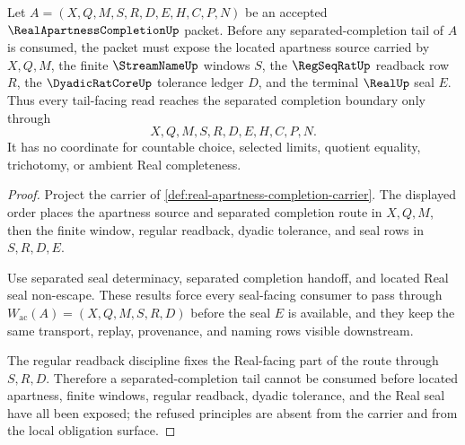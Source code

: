 \begin{theorem}
\label{thm:real-apartness-completion-located-tail-obligation}
Let $A=(X,Q,M,S,R,D,E,H,C,P,N)$ be an accepted $\RealApartnessCompletionUp$ packet. Before any separated-completion tail of $A$ is consumed, the packet must expose the located apartness source carried by $X,Q,M$, the finite $\StreamNameUp$ windows $S$, the $\RegSeqRatUp$ readback row $R$, the $\DyadicRatCoreUp$ tolerance ledger $D$, and the terminal $\RealUp$ seal $E$. Thus every tail-facing read reaches the separated completion boundary only through
$$
X,Q,M,S,R,D,E,H,C,P,N .
$$
It has no coordinate for countable choice, selected limits, quotient equality, trichotomy, or ambient Real completeness.
\end{theorem}
\begin{proof}
Project the carrier of \autoref{def:real-apartness-completion-carrier}. The displayed order places the apartness source and separated completion route in $X,Q,M$, then the finite window, regular readback, dyadic tolerance, and seal rows in $S,R,D,E$.

Use separated seal determinacy, separated completion handoff, and located Real seal non-escape. These results force every seal-facing consumer to pass through $W_{\mathrm{ac}}(A)=(X,Q,M,S,R,D)$ before the seal $E$ is available, and they keep the same transport, replay, provenance, and naming rows visible downstream.

The regular readback discipline fixes the Real-facing part of the route through $S,R,D$. Therefore a separated-completion tail cannot be consumed before located apartness, finite windows, regular readback, dyadic tolerance, and the Real seal have all been exposed; the refused principles are absent from the carrier and from the local obligation surface.
\end{proof}

